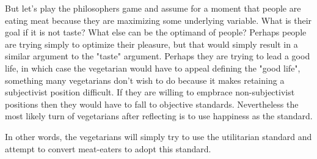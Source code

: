 But let's play the philosophers game and assume for a moment that people are eating meat because they are maximizing some underlying variable. What is their goal if it is not taste? What else can be the optimand of people? Perhaps people are trying simply to optimize their pleasure, but that would simply result in a similar argument to the "taste" argument. Perhaps they are trying to lead a good life, in which case the vegetarian would have to appeal defining the "good life", something many vegetarians don't wish to do because it makes retaining a subjectivist position difficult. If they are willing to empbrace non-subjectivist positions then they would have to fall to objective standards. Nevertheless the most likely turn of vegetarians after reflecting is to use happiness as the standard. 

In other words, the vegetarians will simply try to use the utilitarian standard and attempt to convert meat-eaters to adopt this standard. 






